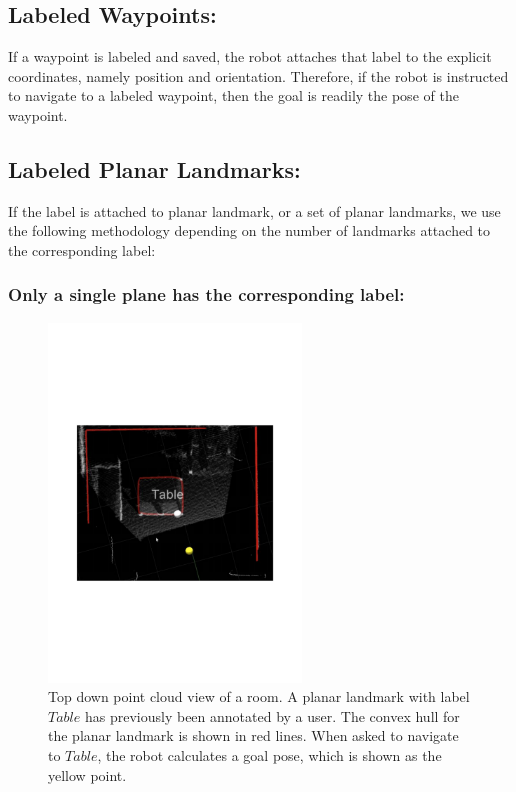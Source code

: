 \documentclass[12pt]{gatech-thesis}
\begin{document}
\subsection{Labeled Waypoints:} If a waypoint is labeled and saved, the robot attaches that label to the explicit coordinates, namely position and orientation. Therefore, if the robot is instructed to navigate to a labeled waypoint, then the goal is readily the pose of the waypoint.
\subsection{Labeled Planar Landmarks:} If the label is attached to planar landmark, or a set of planar landmarks, we use the following methodology depending on the number of landmarks attached to the corresponding label:

\subsubsection{Only a single plane has the corresponding label: }
\label{sec:navigation_goal_single_label}

\begin{figure}[ht!]
\centering
\includegraphics[width=0.6\textwidth]{pics/single_plane}
\caption{Top down point cloud view of a room. A planar landmark with label $Table$ has previously been annotated by a user. The convex hull for the planar landmark is shown in red lines. When asked to navigate to $Table$, the robot calculates a goal pose, which is shown as the yellow point.}
\label{fig:single_plane}
\end{figure}
\end{document}
